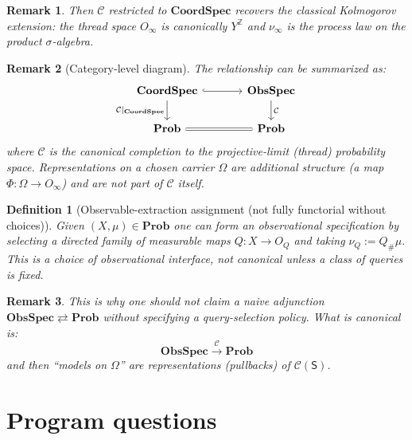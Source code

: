\documentclass[11pt]{article}
\newtheorem{definition}{Definition}
\newtheorem{remark}{Remark}
\begin{document}
\begin{remark}
Then $\mathcal C$ restricted to $\mathbf{CoordSpec}$ recovers the classical
Kolmogorov extension: the thread space $O_\infty$ is canonically $Y^{\mathbb Z}$ and
$\nu_\infty$ is the process law on the product $\sigma$-algebra.
\end{remark}


\begin{remark}[Category-level diagram]
The relationship can be summarized as:
\[
\begin{tikzcd}[column sep=large]
\mathbf{CoordSpec} \arrow[r,hook] \arrow[d,"\mathcal C|_{\mathbf{CoordSpec}}"']
& \mathbf{ObsSpec} \arrow[d,"\mathcal C"] \\
\mathbf{Prob} \arrow[r,equal]
& \mathbf{Prob}
\end{tikzcd}
\]
where $\mathcal C$ is the canonical completion to the projective-limit (thread) probability space.
Representations on a chosen carrier $\Omega$ are additional structure (a map $\Phi:\Omega\to O_\infty$)
and are not part of $\mathcal C$ itself.
\end{remark}


\begin{definition}[Observable-extraction assignment (not fully functorial without choices)]
Given $(X,\mu)\in\mathbf{Prob}$ one can form an observational specification by selecting a
directed family of measurable maps $Q:X\to O_Q$ and taking $\nu_Q:=Q_\#\mu$.
This is a \emph{choice} of observational interface, not canonical unless a class of queries is fixed.
\end{definition}

\begin{remark}
This is why one should not claim a naive adjunction $\mathbf{ObsSpec}\rightleftarrows\mathbf{Prob}$
without specifying a query-selection policy. What \emph{is} canonical is:
\[
\mathbf{ObsSpec}\xrightarrow{\ \mathcal C\ }\mathbf{Prob}
\]
and then “models on $\Omega$” are representations (pullbacks) of $\mathcal C(\mathsf S)$.
\end{remark}

\section{Program questions}
\end{document}
